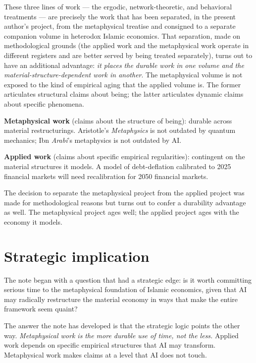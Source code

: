 \documentclass[11pt,a4paper]{article}
\newcommand{\arb}[1]{\textit{#1}}
\begin{document}
These three lines of work --- the ergodic, network-theoretic, and
behavioral treatments --- are precisely the work that has been
separated, in the present author's project, from the metaphysical
treatise and consigned to a separate companion volume in
heterodox Islamic economics. That separation, made on
methodological grounds (the applied work and the metaphysical work
operate in different registers and are better served by being
treated separately), turns out to have an additional advantage:
\textit{it places the durable work in one volume and the
material-structure-dependent work in another}. The metaphysical
volume is not exposed to the kind of empirical aging that the
applied volume is. The former articulates structural claims about
being; the latter articulates dynamic claims about specific
phenomena.

\begin{contrastbox}
\textbf{Metaphysical work} (claims about the structure of being):
durable across material restructurings. Aristotle's
\textit{Metaphysics} is not outdated by quantum mechanics; Ibn
\arb{Arabi}'s metaphysics is not outdated by AI.

\textbf{Applied work} (claims about specific empirical
regularities): contingent on the material structures it models.
A model of debt-deflation calibrated to 2025 financial markets
will need recalibration for 2050 financial markets.

The decision to separate the metaphysical project from the
applied project was made for methodological reasons but turns
out to confer a durability advantage as well. The metaphysical
project ages well; the applied project ages with the economy it
models.
\end{contrastbox}

\section{Strategic implication}
\label{sec:strategic}

The note began with a question that had a strategic edge: is it
worth committing serious time to the metaphysical foundation of
Islamic economics, given that AI may radically restructure the
material economy in ways that make the entire framework seem
quaint?

The answer the note has developed is that the strategic logic
points the other way. \textit{Metaphysical work is the more
durable use of time, not the less.} Applied work depends on
specific empirical structures that AI may transform. Metaphysical
work makes claims at a level that AI does not touch.
\end{document}
